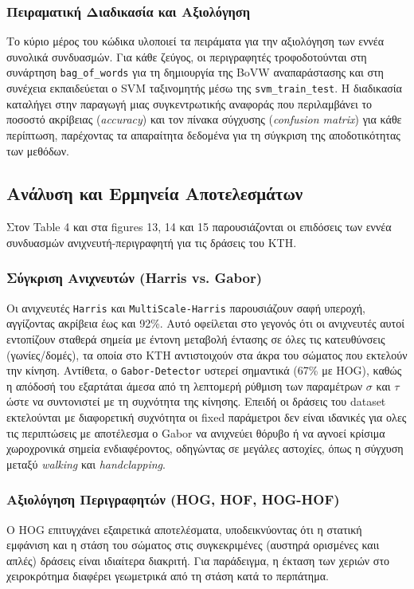 \documentclass[12pt]{article}
\begin{document}
\subsubsection*{Πειραματική Διαδικασία και Αξιολόγηση}
\hspace{0.6cm}Το κύριο μέρος του κώδικα υλοποιεί τα πειράματα για την αξιολόγηση των εννέα συνολικά συνδυασμών. Για κάθε ζεύγος, οι περιγραφητές τροφοδοτούνται στη συνάρτηση \texttt{bag\_of\_words} για τη δημιουργία της BoVW αναπαράστασης και στη συνέχεια εκπαιδεύεται ο SVM ταξινομητής μέσω της \texttt{svm\_train\_test}. Η διαδικασία καταλήγει στην παραγωγή μιας συγκεντρωτικής αναφοράς που περιλαμβάνει το ποσοστό ακρίβειας (\textit{accuracy}) και τον πίνακα σύγχυσης (\textit{confusion matrix}) για κάθε περίπτωση, παρέχοντας τα απαραίτητα δεδομένα για τη σύγκριση της αποδοτικότητας των μεθόδων.

\subsection*{Ανάλυση και Ερμηνεία Αποτελεσμάτων}
Στον Table 4 και στα figures 13, 14 και 15 παρουσιάζονται οι επιδόσεις των εννέα συνδυασμών ανιχνευτή-περιγραφητή για τις δράσεις του KTH.

\subsubsection*{Σύγκριση Ανιχνευτών (Harris vs. Gabor)}
\hspace{0.6cm}Οι ανιχνευτές \texttt{Harris} και \texttt{MultiScale-Harris} παρουσιάζουν σαφή υπεροχή, αγγίζοντας ακρίβεια έως και 92\%. Αυτό οφείλεται στο γεγονός ότι οι ανιχνευτές αυτοί εντοπίζουν σταθερά σημεία με έντονη μεταβολή έντασης σε όλες τις κατευθύνσεις (γωνίες/δομές), τα οποία στο KTH αντιστοιχούν στα άκρα του σώματος που εκτελούν την κίνηση. Αντίθετα, ο \texttt{Gabor-Detector} υστερεί σημαντικά (67\% με HOG), καθώς η απόδοσή του εξαρτάται άμεσα από τη λεπτομερή ρύθμιση των παραμέτρων $\sigma$ και $\tau$ ώστε να συντονιστεί με τη συχνότητα της κίνησης. Επειδή οι δράσεις του dataset εκτελούνται με διαφορετική συχνότητα οι fixed παράμετροι δεν είναι ιδανικές για ολες τις περιπτώσεις με αποτέλεσμα ο Gabor να ανιχνεύει θόρυβο ή να αγνοεί κρίσιμα χωροχρονικά σημεία ενδιαφέροντος, οδηγώντας σε μεγάλες αστοχίες, όπως η σύγχυση μεταξύ \textit{walking} και \textit{handclapping}.

\subsubsection*{Αξιολόγηση Περιγραφητών (HOG, HOF, HOG-HOF)}
 \hspace{0.6cm}Ο HOG επιτυγχάνει εξαιρετικά αποτελέσματα, υποδεικνύοντας ότι η στατική εμφάνιση και η στάση του σώματος στις συγκεκριμένες (αυστηρά ορισμένες καιι απλές) δράσεις είναι ιδιαίτερα διακριτή. Για παράδειγμα, η έκταση των χεριών στο χειροκρότημα διαφέρει γεωμετρικά από τη στάση κατά το περπάτημα.
\end{document}
